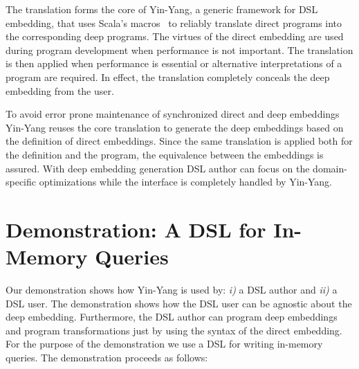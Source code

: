 \documentclass{llncs}
\newcommand{\tool}{Yin-Yang\xspace}
\begin{document}
The translation forms the core of \tool, a generic framework for DSL
embedding, that uses Scala's macros~\cite{burmako_scala_2013} to reliably
translate direct \edsl{} programs into the corresponding deep \edsl programs.
The virtues of the direct embedding are used during program development when
performance is not important. The translation is then applied when performance
is essential or alternative interpretations of a program are required. In
effect, the translation completely conceals the deep embedding from the user.

To avoid error prone maintenance of synchronized direct and deep embeddings
\tool reuses the core translation to generate the deep embeddings based on the
definition of direct embeddings. Since the same translation is applied both
for the \edsl definition and the \edsl program, the equivalence between the
embeddings is assured. With deep embedding generation DSL author can focus on
the domain-specific optimizations while the interface is completely handled by
\tool.


\section{Demonstration: A DSL for In-Memory Queries}

  

  Our demonstration shows how \tool is used by: \emph{i)} a DSL author and \emph{ii)} a DSL user. The demonstration shows how the DSL user can be agnostic about the deep embedding. Furthermore, the DSL author can program deep embeddings and program transformations just by using the syntax of the direct embedding. For the purpose of the demonstration we use a DSL for writing in-memory queries. The demonstration proceeds as follows: 
\end{document}
